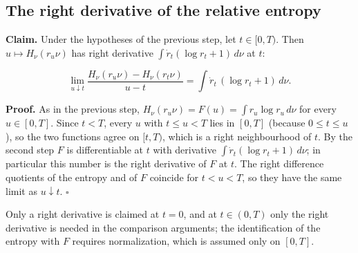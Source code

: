 \documentclass[11pt,a4paper]{report}
\begin{document}
\subsection{\texorpdfstring{The right derivative of the relative entropy}{The right derivative of the relative entropy}}
\label{report-step-UnadjustedLangevin-LSI-Regularity-lean-6}


\textbf{Claim.} Under the hypotheses of the previous step, let \(t\in[0,T)\). Then \(u\mapsto H_\nu(r_u\nu)\) has right derivative \(\int\dot r_t(\log r_t+1)\,d\nu\) at \(t\):


\[\lim_{u\downarrow t}\frac{H_\nu(r_u\nu)-H_\nu(r_t\nu)}{u-t}=\int\dot r_t\,(\log r_t+1)\,d\nu.\]


\textbf{Proof.} As in the previous step, \(H_\nu(r_u\nu)=F(u)=\int r_u\log r_u\,d\nu\) for every \(u\in[0,T]\). Since \(t<T\), every \(u\) with \(t\le u<T\) lies in \([0,T]\) (because \(0\le t\le u\)), so the two functions agree on \([t,T)\), which is a right neighbourhood of \(t\). By the second step \(F\) is differentiable at \(t\) with derivative \(\int\dot r_t(\log r_t+1)\,d\nu\); in particular this number is the right derivative of \(F\) at \(t\). The right difference quotients of the entropy and of \(F\) coincide for \(t<u<T\), so they have the same limit as \(u\downarrow t\). \(\square\)




Only a right derivative is claimed at \(t=0\), and at \(t\in(0,T)\) only the right derivative is needed in the comparison arguments; the identification of the entropy with \(F\) requires normalization, which is assumed only on \([0,T]\).
\end{document}
